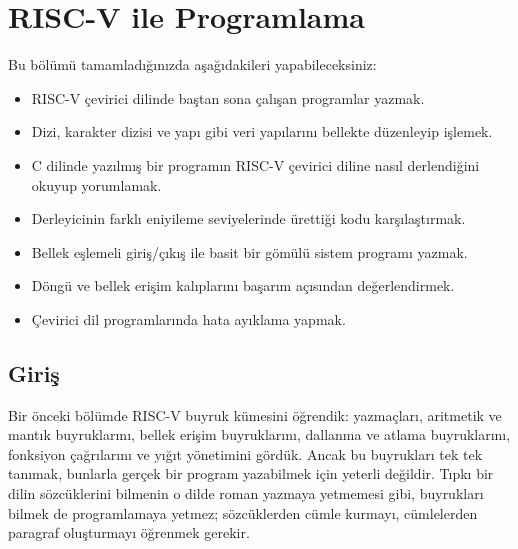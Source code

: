 
\chapter{RISC-V ile Programlama}
\label{chap:programlama}

\begin{tcolorbox}[
    colframe=sinyalyesil!60!black,
    title={\textbf{Öğrenme Hedefleri}},
    fonttitle=\bfseries,
    rounded corners,
    boxrule=0.8pt
]
Bu bölümü tamamladığınızda aşağıdakileri yapabileceksiniz:
\begin{itemize}[nosep, leftmargin=*]
    \item RISC-V çevirici dilinde baştan sona çalışan programlar yazmak.
    \item Dizi, karakter dizisi ve yapı gibi veri yapılarını bellekte düzenleyip işlemek.
    \item C dilinde yazılmış bir programın RISC-V çevirici diline nasıl derlendiğini okuyup yorumlamak.
    \item Derleyicinin farklı eniyileme seviyelerinde ürettiği kodu karşılaştırmak.
    \item Bellek eşlemeli giriş/çıkış ile basit bir gömülü sistem programı yazmak.
    \item Döngü ve bellek erişim kalıplarını başarım açısından değerlendirmek.
    \item Çevirici dil programlarında hata ayıklama yapmak.
\end{itemize}
\end{tcolorbox}

\section*{Giriş}

Bir önceki bölümde RISC-V buyruk kümesini öğrendik: yazmaçları, aritmetik ve mantık buyruklarını, bellek erişim buyruklarını, dallanma ve atlama buyruklarını, fonksiyon çağrılarını ve yığıt yönetimini gördük. Ancak bu buyrukları tek tek tanımak, bunlarla gerçek bir program yazabilmek için yeterli değildir. Tıpkı bir dilin sözcüklerini bilmenin o dilde roman yazmaya yetmemesi gibi, buyrukları bilmek de programlamaya yetmez; sözcüklerden cümle kurmayı, cümlelerden paragraf oluşturmayı öğrenmek gerekir.

